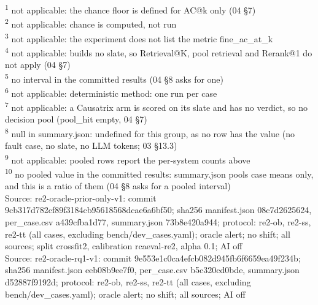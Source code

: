 \begin{table}[t]
\begin{tabular}{lllllllllllllllllllll}
\hline
\end{tabular}
\par\smallskip\footnotesize
\textsuperscript{1} not applicable: the chance floor is defined for AC@k only (04 \S{}7)\\
\textsuperscript{2} not applicable: chance is computed, not run\\
\textsuperscript{3} not applicable: the experiment does not list the metric fine\_ac\_at\_k\\
\textsuperscript{4} not applicable: builds no slate, so Retrieval@K, pool retrieval and Rerank@1 do not apply (04 \S{}7)\\
\textsuperscript{5} no interval in the committed results (04 \S{}8 asks for one)\\
\textsuperscript{6} not applicable: deterministic method: one run per case\\
\textsuperscript{7} not applicable: a Causatrix arm is scored on its slate and has no verdict, so no decision pool (pool\_hit empty, 04 \S{}7)\\
\textsuperscript{8} null in summary.json: undefined for this group, as no row has the value (no fault case, no slate, no LLM tokens; 03 \S{}13.3)\\
\textsuperscript{9} not applicable: pooled rows report the per-system counts above\\
\textsuperscript{10} no pooled value in the committed results: summary.json pools case means only, and this is a ratio of them (04 \S{}8 asks for a pooled interval)\\
Source: re2-oracle-prior-only-v1: commit 9cb317d782cf89f3184cb95618568dcae6a6bf50; sha256 manifest.json 08c7d2625624, per\_case.csv a439cfba1d77, summary.json 73b8e420a944; protocol: re2-ob, re2-ss, re2-tt (all cases, excluding bench/dev\_cases.yaml); oracle alert; no shift; all sources; split crossfit2, calibration rcaeval-re2, alpha 0.1; AI off\\
Source: re2-oracle-rq1-v1: commit 9e553e1c0ca4efcb082d945fb6f6659ea49f234b; sha256 manifest.json eeb08b9ee7f0, per\_case.csv b5c320cd0bde, summary.json d52887f9192d; protocol: re2-ob, re2-ss, re2-tt (all cases, excluding bench/dev\_cases.yaml); oracle alert; no shift; all sources; AI off\\
\end{table}
